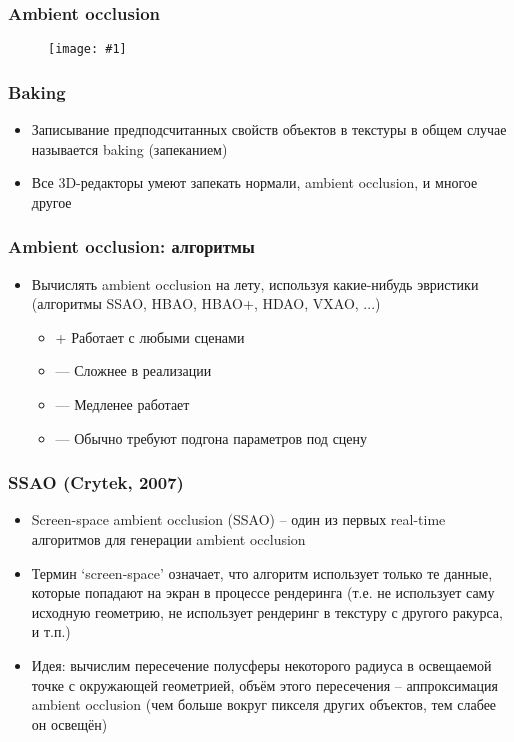 \documentclass{beamer}
\newcommand{\slideimage}[1]{
  \begin{figure}
    \begin{adjustbox}{width=\textwidth, totalheight=\textheight-2\baselineskip-2\baselineskip,keepaspectratio}
      \texttt{[image: \#1]}
    \end{adjustbox}
  \end{figure}
}
\begin{document}
\begin{frame}[fragile]
\frametitle{Ambient occlusion}
\slideimage{baked-ao.png}
\end{frame}

\begin{frame}[fragile]
\frametitle{Baking}
\begin{itemize}
\item Записывание предподсчитанных свойств объектов в текстуры в общем случае называется baking (запеканием)
\pause
\item Все 3D-редакторы умеют запекать нормали, ambient occlusion, и многое другое
\end{itemize}
\end{frame}

\begin{frame}[fragile]
\frametitle{Ambient occlusion: алгоритмы}
\begin{itemize}
\item Вычислять ambient occlusion на лету, используя какие-нибудь эвристики (алгоритмы SSAO, HBAO, HBAO+, HDAO, VXAO, ...)
\pause
\begin{itemize}
\item {\color{green}+} Работает с любыми сценами
\item {\color{red}—} Сложнее в реализации
\item {\color{red}—} Медленее работает
\item {\color{red}—} Обычно требуют подгона параметров под сцену
\end{itemize}
\end{itemize}
\end{frame}

\begin{frame}[fragile]
\frametitle{SSAO (Crytek, 2007)}
\begin{itemize}
\item Screen-space ambient occlusion (SSAO) -- один из первых real-time алгоритмов для генерации ambient occlusion
\pause
\item Термин `screen-space' означает, что алгоритм использует только те данные, которые попадают на экран в процессе рендеринга (т.е. не использует саму исходную геометрию, не использует рендеринг в текстуру с другого ракурса, и т.п.)
\pause
\item Идея: вычислим пересечение полусферы некоторого радиуса в освещаемой точке с окружающей геометрией, объём этого пересечения -- аппроксимация ambient occlusion (чем больше вокруг пикселя других объектов, тем слабее он освещён)
\end{itemize}
\end{frame}
\end{document}
